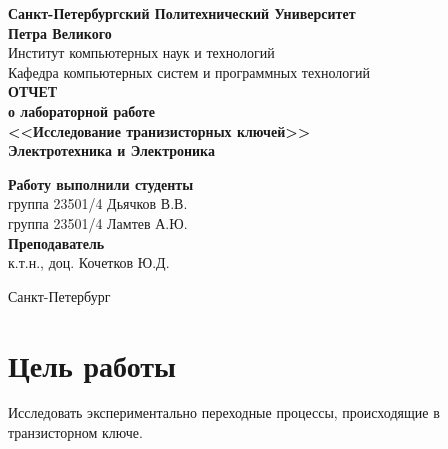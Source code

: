 \documentclass[a4paper,14pt]{extarticle}
\newcommand{\sign}[1][5cm]{\makebox[#1]{\hrulefill}} %
\begin{document}
\begin{titlepage}
\begin{center}
	\textbf{Санкт-Петербургский Политехнический Университет \\Петра Великого}\\[0.3cm]
	\small Институт компьютерных наук и технологий \\[0.3cm]
	\small Кафедра компьютерных систем и программных технологий\\[4cm]
	
	\textbf{ОТЧЕТ}\\ \textbf{о лабораторной работе}\\[0.5cm]
	\textbf{<<Исследование транизисторных ключей>>}\\[0.1cm]
	\textbf{Электротехника и Электроника}\\[10.5cm]
\end{center}

\begin{flushright}
	\begin{minipage}{0.60\textwidth}
		\begin{flushleft}
			\small \textbf{Работу выполнили студенты}\\[3mm]
			\small группа 23501/4 \hspace*{17mm} Дьячков В.В.\\[3mm]
			\small группа 23501/4 \hspace*{17mm} Ламтев А.Ю.\\[5mm]
			
			\small \textbf{Преподаватель}\\[5mm]
		 	\small \sign[3.5cm] \hspace*{8mm} к.т.н., доц. Кочетков Ю.Д.\\[0.5cm]
		\end{flushleft}
	\end{minipage}
\end{flushright}

\vfill

\begin{center}
	\small Санкт-Петербург\\
	\small \the\year
\end{center}
\end{titlepage}

\section{Цель работы}

Исследовать экспериментально переходные процессы, происходящие в транзисторном ключе.
\end{document}
